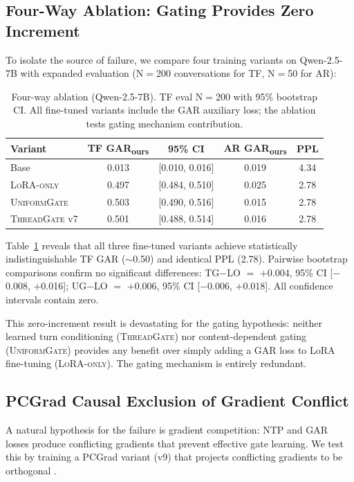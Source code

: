 \documentclass[11pt]{article}
\newcommand{\gar}{\textsc{GAR}}
\newcommand{\garours}{\textsc{GAR}\textsubscript{ours}}
\newcommand{\tg}{\textsc{ThreadGate}}
\newcommand{\ug}{\textsc{UniformGate}}
\newcommand{\lo}{\textsc{LoRA-only}}
\begin{document}
\subsection{Four-Way Ablation: Gating Provides Zero Increment}
\label{sec:ablation}

To isolate the source of failure, we compare four training variants on Qwen-2.5-7B with expanded evaluation (N$=$200 conversations for TF, N$=$50 for AR):

\begin{table}[t]
\centering
\small
\caption{Four-way ablation (Qwen-2.5-7B). TF eval N$=$200 with 95\% bootstrap CI. All fine-tuned variants include the \gar{} auxiliary loss; the ablation tests gating mechanism contribution.}
\label{tab:ablation}
\begin{tabular}{lcccc}
\toprule
\textbf{Variant} & \textbf{TF \garours{}} & \textbf{95\% CI} & \textbf{AR \garours{}} & \textbf{PPL} \\
\midrule
Base & 0.013 & [0.010, 0.016] & 0.019 & 4.34 \\
\lo{} & 0.497 & [0.484, 0.510] & 0.025 & 2.78 \\
\ug{} & 0.503 & [0.490, 0.516] & 0.015 & 2.78 \\
\tg{} v7 & 0.501 & [0.488, 0.514] & 0.016 & 2.78 \\
\bottomrule
\end{tabular}
\end{table}

Table~\ref{tab:ablation} reveals that all three fine-tuned variants achieve statistically indistinguishable TF \gar{} ($\sim$0.50) and identical PPL (2.78). Pairwise bootstrap comparisons confirm no significant differences: TG$-$LO $=$ $+$0.004, 95\% CI [$-$0.008, $+$0.016]; UG$-$LO $=$ $+$0.006, 95\% CI [$-$0.006, $+$0.018]. All confidence intervals contain zero.

This zero-increment result is devastating for the gating hypothesis: neither learned turn conditioning (\tg{}) nor content-dependent gating (\ug{}) provides any benefit over simply adding a \gar{} loss to LoRA fine-tuning (\lo{}). The gating mechanism is entirely redundant.

\subsection{PCGrad Causal Exclusion of Gradient Conflict}
\label{sec:pcgrad}

A natural hypothesis for the failure is gradient competition: NTP and \gar{} losses produce conflicting gradients that prevent effective gate learning. We test this by training a PCGrad variant (v9) that projects conflicting gradients to be orthogonal \citep{yu2020gradient}.
\end{document}
